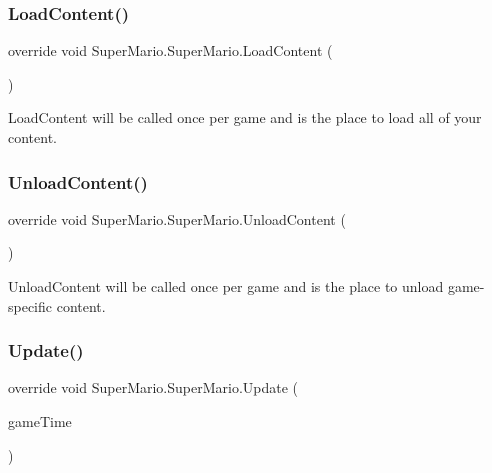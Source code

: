\subsubsection{\texorpdfstring{Load\+Content()}{LoadContent()}}
{\footnotesize\ttfamily override void Super\+Mario.\+Super\+Mario.\+Load\+Content (\begin{DoxyParamCaption}{ }\end{DoxyParamCaption})\hspace{0.3cm}{\ttfamily [protected]}}



Load\+Content will be called once per game and is the place to load all of your content. 

\mbox{\label{class_super_mario_1_1_super_mario_afbf7a1973bf71e92c27161619b7af783}} 
\subsubsection{\texorpdfstring{Unload\+Content()}{UnloadContent()}}
{\footnotesize\ttfamily override void Super\+Mario.\+Super\+Mario.\+Unload\+Content (\begin{DoxyParamCaption}{ }\end{DoxyParamCaption})\hspace{0.3cm}{\ttfamily [protected]}}



Unload\+Content will be called once per game and is the place to unload game-\/specific content. 

\mbox{\label{class_super_mario_1_1_super_mario_a6a180f8c2906720694ca231dfff6c4b1}} 
\subsubsection{\texorpdfstring{Update()}{Update()}}
{\footnotesize\ttfamily override void Super\+Mario.\+Super\+Mario.\+Update (\begin{DoxyParamCaption}\item[{Game\+Time}]{game\+Time }\end{DoxyParamCaption})\hspace{0.3cm}{\ttfamily [protected]}}



